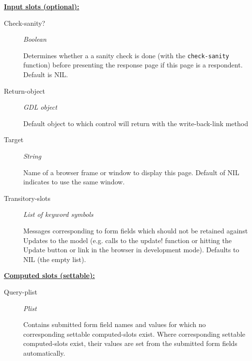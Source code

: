 \documentclass [11pt]{book}
\begin{document}
\begin{itemize}
\begin{description}
\end{description}








\textbf{
\underline{Input slots (optional):}}

\begin{description}

\item [Check-sanity?]
\emph{Boolean}

 Determines whether a a sanity check is done (with the \texttt{check-sanity} function) before
presenting the response page if this page is a respondent. Default is NIL.




\item [Return-object]
\emph{GDL object}

 Default object to which control will return with the write-back-link method




\item [Target]
\emph{String}

 Name of a browser frame or window to display this page. Default of NIL indicates to use the same window.




\item [Transitory-slots]
\emph{List of keyword symbols}

 Messages corresponding to form fields which should not be retained
against Updates to the model (e.g. calls to the update! function or hitting the Update button or link in
the browser in development mode). Defaults to NIL (the empty list).




\end{description}






\textbf{
\underline{Computed slots (settable):}}

\begin{description}

\item [Query-plist]
\emph{Plist}

 Contains submitted form field names and values for which no corresponding settable
computed-slots exist. Where corresponding settable computed-slots exist, their values are set from
the submitted form fields automatically.





\end{description}
\end{itemize}
\end{document}
